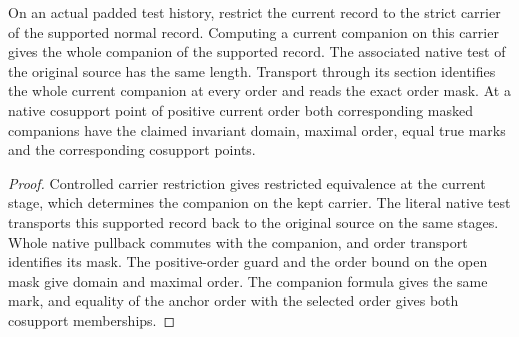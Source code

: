 \begin{theorem}
\label{hir:g1-actual-normal-order-companion}
\leanok
On an actual padded test history, restrict the current record to the
strict carrier of the supported normal record. Computing a current
companion on this carrier gives the whole companion of the
supported record. The associated native test of the original source
has the same length. Transport through its section identifies the
whole current companion at every order and reads the exact order
mask. At a native cosupport point of positive current order both
corresponding masked companions have the claimed invariant domain,
maximal order, equal true marks and the corresponding cosupport
points.
\end{theorem}
\begin{proof}
Controlled carrier restriction gives restricted equivalence at the
current stage, which determines the companion on the kept carrier.
The literal native test transports this supported record back to
the original source on the same stages. Whole native pullback
commutes with the companion, and order transport identifies its
mask. The positive-order guard and the order bound on the open mask
give domain and maximal order. The companion formula gives the same
mark, and equality of the anchor order with the selected order gives
both cosupport memberships.
\end{proof}

